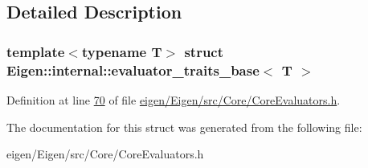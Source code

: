 \subsection{Detailed Description}
\subsubsection*{template$<$typename T$>$\newline
struct Eigen\+::internal\+::evaluator\+\_\+traits\+\_\+base$<$ T $>$}



Definition at line \hyperlink{eigen_2_eigen_2src_2_core_2_core_evaluators_8h_source_l00070}{70} of file \hyperlink{eigen_2_eigen_2src_2_core_2_core_evaluators_8h_source}{eigen/\+Eigen/src/\+Core/\+Core\+Evaluators.\+h}.



The documentation for this struct was generated from the following file\+:\begin{DoxyCompactItemize}
\item 
eigen/\+Eigen/src/\+Core/\+Core\+Evaluators.\+h\end{DoxyCompactItemize}
